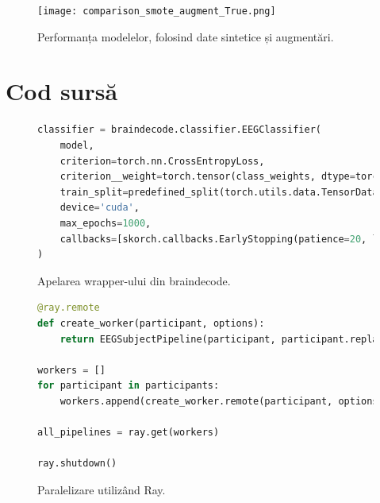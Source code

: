 \begin{figure}
    \centering
    \texttt{[image: comparison\_smote\_augment\_True.png]}
    \caption{Performanța modelelor, folosind date sintetice și augmentări.}
    \label{fig:smote_augment_true}
\end{figure}

\chapter{Cod sursă}

\begin{figure}[H]
\begin{lstlisting}[language=Python]
classifier = braindecode.classifier.EEGClassifier(
    model,
    criterion=torch.nn.CrossEntropyLoss,
    criterion__weight=torch.tensor(class_weights, dtype=torch.float32) if imbalance_mode=='class_weights' else None,
    train_split=predefined_split(torch.utils.data.TensorDataset(torch.tensor(X_valid).float(), torch.tensor(y_valid).long())),
    device='cuda',
    max_epochs=1000,
    callbacks=[skorch.callbacks.EarlyStopping(patience=20, load_best=True), skorch.callbacks.Checkpoint(), skorch.callbacks.LRScheduler()],
)
\end{lstlisting}
\caption{Apelarea wrapper-ului din braindecode.}
\label{fig:wrapper_braindecode}
\end{figure}

\begin{figure}[H]
\begin{lstlisting}[language=Python]
@ray.remote
def create_worker(participant, options):
    return EEGSubjectPipeline(participant, participant.replace("raw.csv", "quizz.xlsx"), 'dsi-24.elc', options)

workers = []
for participant in participants:
    workers.append(create_worker.remote(participant, options))

all_pipelines = ray.get(workers)

ray.shutdown()
\end{lstlisting}
\caption{Paralelizare utilizând Ray.}
\label{fig:paralelizare_ray}
\end{figure}




